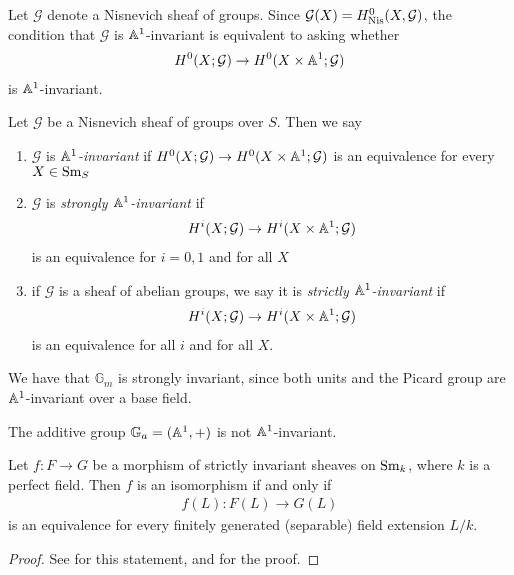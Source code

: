 \documentclass[11pt]{amsart}
\begin{document}
Let $\mathcal{G}$ denote a Nisnevich sheaf of groups. Since $\mathcal{G}(X) = H^0_{\mathrm{Nis}}(X,\mathcal{G})$, the condition that $\mathcal{G}$ is $\mathbb{A}^1$-invariant is equivalent to asking whether
\begin{align*}
    H^0(X; \mathcal{G}) \to H^0(X \times \mathbb{A}^1 ; \mathcal{G})
\end{align*}
is $\mathbb{A}^1$-invariant.


\begin{definition} Let $\mathcal{G}$ be a Nisnevich sheaf of groups over $S$. Then we say
\begin{enumerate}
    \item $\mathcal{G}$ is $\mathbb{A}^1$\textit{-invariant} if $H^0(X; \mathcal{G}) \to H^0(X \times \mathbb{A}^1 ; \mathcal{G})$ is an equivalence for every $X\in \mathrm{Sm}_S$
    \item $\mathcal{G}$ is \textit{strongly $\mathbb{A}^1$-invariant} if
    \begin{align*}
        H^i(X; \mathcal{G}) \to H^i(X \times \mathbb{A}^1; \mathcal{G})
    \end{align*}
    is an equivalence for $i=0,1$ and for all $X$
    \item if $\mathcal{G}$ is a sheaf of abelian groups, we say it is \textit{strictly $\mathbb{A}^1$-invariant} if
    \begin{align*}
        H^i(X; \mathcal{G}) \to H^i(X \times \mathbb{A}^1; \mathcal{G})
    \end{align*}
    is an equivalence for all $i$ and for all $X$.
\end{enumerate}
\end{definition}


\begin{example} We have that $\mathbb{G}_m$ is strongly invariant, since both units and the Picard group are $\mathbb{A}^1$-invariant over a base field.
\end{example}

\begin{example} The additive group $\mathbb{G}_a = (\mathbb{A}^1,+)$ is not $\mathbb{A}^1$-invariant.
\end{example}

\begin{theorem}
Let $f \colon F\to G$ be a morphism of strictly invariant sheaves on $\mathrm{Sm}_k$, where $k$ is a perfect field. Then $f$ is an isomorphism if and only if
\begin{align*}
    f(L) \colon F(L) \to G(L)
\end{align*}
is an equivalence for every finitely generated (separable) field extension $L/k$.
\end{theorem}
\begin{proof} See \cite[2.7]{HMH} for this statement, and \cite[2.3,~2.8]{Morel} for the proof.
\end{proof}
\end{document}
